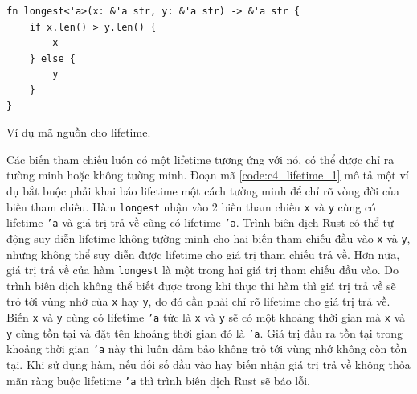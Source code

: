 \begin{listing}[H]
\begin{verbatim}
fn longest<'a>(x: &'a str, y: &'a str) -> &'a str {
    if x.len() > y.len() {
        x
    } else {
        y
    }
}
\end{verbatim}
\caption{Ví dụ mã nguồn cho lifetime.}
\label{code:c4_lifetime_1}
\end{listing}

Các biến tham chiếu luôn có một lifetime tương ứng với nó, có thể được chỉ ra tường minh hoặc không tường minh.
Đoạn mã \ref{code:c4_lifetime_1} mô tả một ví dụ bắt buộc phải khai báo lifetime một cách tường minh để chỉ rõ vòng đời của biến tham chiếu.
Hàm \texttt{longest} nhận vào 2 biến tham chiếu \texttt{x} và \texttt{y} cùng có lifetime \texttt{'a} và giá trị trả về cũng có lifetime \texttt{'a}.
Trình biên dịch Rust có thể tự động suy diễn lifetime không tường minh cho hai biến tham chiếu đầu vào \texttt{x} và \texttt{y}, nhưng không thể suy diễn được lifetime cho giá trị tham chiếu trả về.
Hơn nữa, giá trị trả về của hàm \texttt{longest} là một trong hai giá trị tham chiếu đầu vào.
Do trình biên dịch không thể biết được trong khi thực thi hàm thì giá trị trả về sẽ trỏ tới vùng nhớ của \texttt{x} hay \texttt{y}, do đó cần phải chỉ rõ lifetime cho giá trị trả về.
Biến \texttt{x} và \texttt{y} cùng có lifetime \texttt{'a} tức là \texttt{x} và \texttt{y} sẽ có một khoảng thời gian mà \texttt{x} và \texttt{y} cùng tồn tại và đặt tên khoảng thời gian đó là \texttt{'a}.
Giá trị đầu ra tồn tại trong khoảng thời gian \texttt{'a} này thì luôn đảm bảo không trỏ tới vùng nhớ không còn tồn tại.
Khi sử dụng hàm, nếu đối số đầu vào hay biến nhận giá trị trả về không thỏa mãn ràng buộc lifetime \texttt{'a} thì trình biên dịch Rust sẽ báo lỗi.

\vspace{\baselineskip}

